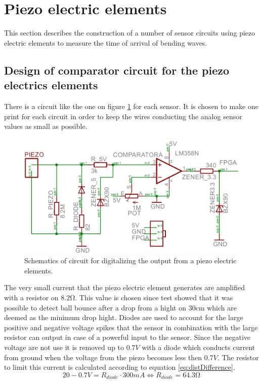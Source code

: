 \section{Piezo electric elements}
\label{piezo}
This section describes the construction of a number of sensor circuits using piezo electric elements to measure the time of arrival of bending waves.
%
\subsection{Design of comparator circuit for the piezo electrics elements}
There is a circuit like the one on figure \ref{fig:print} for each sensor. It is chosen to make one print for each circuit in order to keep the wires conducting the analog sensor values as small as possible. 
\begin{figure}[htb]
	\centering
	\includegraphics[width=.8\textwidth]{figures/Print}
	\caption{Schematics of circuit for digitalizing the output from a piezo electric elements.}
	\label{fig:print}
\end{figure}
The very small current that the piezo electric element generates are amplified with a resistor on $8.2\si{\ohm}$. This value is chosen since test showed that it was possible to detect ball bounce after a drop from a hight on $30\si{\centi\meter}$ which are deemed as the minimum drop hight.
Diodes are used to account for the large positive and negative voltage spikes that the sensor in combination with the large resistor can output in case of a powerful input to the sensor. 
Since the negative voltage are not use it is removed up to $0.7V$ with a diode which conducts current from ground when the voltage from the piezo becomes less then $0.7V$.
The resistor to limit this current is calculated according to equation \ref{eq:distDifference}.
\begin{equation}
 20 - 0.7 V = R_{diode} \cdot 300mA \Leftrightarrow R_{diode} = 64.3\si{\ohm}
 \label{diodeResistor}
\end{equation}
